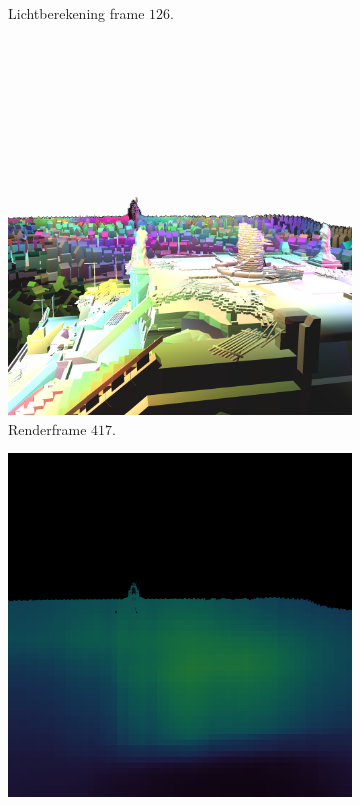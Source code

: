 \begin{figure}[t]
\begin{subfigure}[b]{0.35\textwidth}
    \caption{Lichtberekening frame $126$.}
    \vspace{2pt}
    \label{fig:ts-test-frames-example:pa:126lc}
  \end{subfigure}\\
  \begin{subfigure}[b]{0.35\textwidth}
    \includegraphics[width=\textwidth]{./img/raw/lc-frame-example/render/zc_frame_417.png}
    \caption{Renderframe $417$.}
    \label{fig:ts-test-frames-example:zc:417render}
  \end{subfigure}\quad %
  \begin{subfigure}[b]{0.35\textwidth}
    \includegraphics[width=\textwidth]{./img/raw/lc-frame-example/ts/zc_frame_417.png}

\end{subfigure}
\end{figure}
